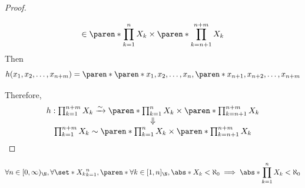 \begin{proof}
\begin{itemize}
\[            \in \paren*{\prod_{k = 1}^{n} X_{k}} \times \paren*{\prod_{k = n + 1}^{n + m} X_{k}}
          \]
          Then
          \[
            h(x_{1}, x_{2}, \ldots, x_{n + m}) = \paren*{\paren*{x_{1}, x_{2}, \ldots, x_{n}},
              \paren*{x_{n + 1}, x_{n + 2}, \ldots, x_{n + m}}}
          \]
  \end{itemize}
  Therefore,
  \[
    \begin{array}{c}
      h: \prod_{k = 1}^{n + m} X_{k} \xrightarrow{\sim} \paren*{\prod_{k = 1}^{n} X_{k}}
      \times \paren*{\prod_{k = n + 1}^{n + m} X_{k}} \\
      \Downarrow                                      \\
      \prod_{k = 1}^{n + m} X_{k} \sim \paren*{\prod_{k = 1}^{n} X_{k}} \times \paren*{\prod_{k = n + 1}^{n + m} X_{k}}
    \end{array}
  \]
\end{proof}

\begin{theorem} \label{an1:thm:product-of-finite-sets-is-finite}
  \[
    \forall n \in [0, \infty)_{\N}, \forall \set*{X_{k}}_{k = 1}^{n},
    \paren*{\forall k \in [1, n]_{\N}, \abs*{X_{k}} < \aleph_{0}}
    \implies \abs*{\prod_{k = 1}^{n} X_{k}} < \aleph_{0}
  \]
\end{theorem}
